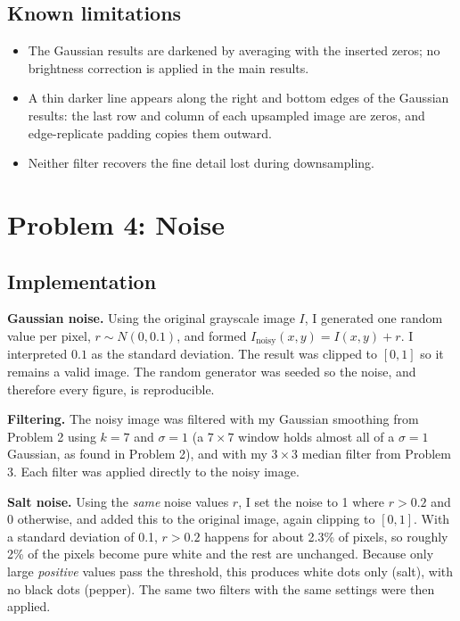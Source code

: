 \documentclass[11pt]{article}
\begin{document}
\subsection*{Known limitations}
\begin{itemize}
  \item The Gaussian results are darkened by averaging with the inserted
        zeros; no brightness correction is applied in the main results.
  \item A thin darker line appears along the right and bottom edges of the
        Gaussian results: the last row and column of each upsampled image are
        zeros, and edge-replicate padding copies them outward.
  \item Neither filter recovers the fine detail lost during downsampling.
\end{itemize}


\section*{Problem 4: Noise}

\subsection*{Implementation}
\textbf{Gaussian noise.} Using the original grayscale image $I$, I generated
one random value per pixel, $r \sim N(0, 0.1)$, and formed
$I_{\text{noisy}}(x, y) = I(x, y) + r$. I interpreted $0.1$ as the standard
deviation. The result was clipped to $[0, 1]$ so it remains a valid image. The
random generator was seeded so the noise, and therefore every figure, is
reproducible.

\textbf{Filtering.} The noisy image was filtered with my Gaussian smoothing
from Problem 2 using $k = 7$ and $\sigma = 1$ (a $7 \times 7$ window holds
almost all of a $\sigma = 1$ Gaussian, as found in Problem 2), and with my
$3 \times 3$ median filter from Problem 3. Each filter was applied directly to
the noisy image.

\textbf{Salt noise.} Using the \emph{same} noise values $r$, I set the noise to
1 where $r > 0.2$ and 0 otherwise, and added this to the original image,
again clipping to $[0, 1]$. With a standard deviation of 0.1, $r > 0.2$ happens
for about 2.3\% of pixels, so roughly 2\% of the pixels become pure white and
the rest are unchanged. Because only large \emph{positive} values pass the
threshold, this produces white dots only (salt), with no black dots (pepper).
The same two filters with the same settings were then applied.
\end{document}
